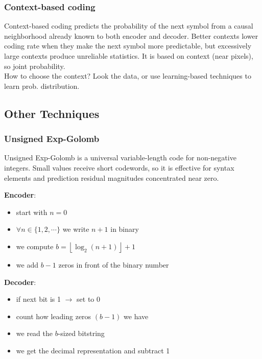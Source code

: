 \subsubsection{Context-based coding}
Context-based coding predicts the probability of the next symbol from a causal neighborhood already known to both encoder and decoder. Better contexts lower coding rate when they make the next symbol more predictable, but excessively large contexts produce unreliable statistics.
It is based on context (near pixels), so joint probability.\\
How to choose the context? Look the data, or use learning-based techniques to learn prob. distribution.
\subsection{Other Techniques}
\subsubsection{Unsigned Exp-Golomb}
Unsigned Exp-Golomb is a universal variable-length code for non-negative integers. Small values receive short codewords, so it is effective for syntax elements and prediction residual magnitudes concentrated near zero.
\begin{minipage}{0.5\textwidth}
    \textbf{Encoder}:
    \begin{itemize}
        \item start with $n=0$
        \item $\forall n \in \{1,2,\cdots\}$ we write $n+1$ in binary
        \item we compute $b = \left\lfloor\log_2(n+1)\right\rfloor + 1$
        \item we add $b-1$ zeros in front of the binary number
    \end{itemize}
\end{minipage}
\begin{minipage}{0.5\textwidth}
    \textbf{Decoder}:
    \begin{itemize}
        \item if next bit is 1 $\to$ set to $0$
        \item count how leading zeros $(b-1)$ we have
        \item we read the $b$-sized bitstring
        \item we get the decimal representation and subtract 1
    \end{itemize}
\end{minipage}

